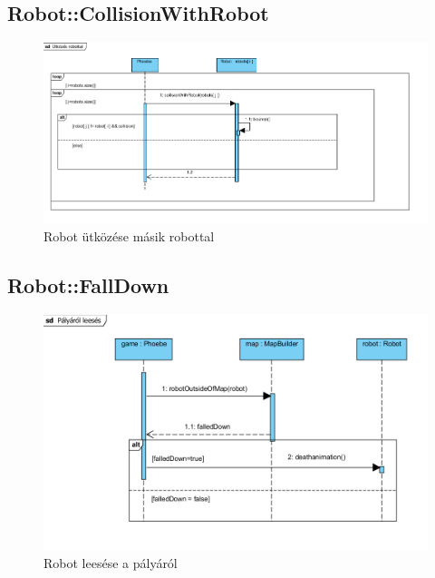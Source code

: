 \subsection{Robot::CollisionWithRobot}
\begin{figure}[h]
\begin{center}
\includegraphics[width=17cm]{images/collisionWithRobot()_sequence.PNG}
\caption{Robot ütközése másik robottal}
\label{fig:example5}
\end{center}
\end{figure}
\pagebreak

\subsection{Robot::FallDown}
\begin{figure}[h]
\begin{center}
\includegraphics[width=17cm]{images/FallingDown.PNG}
\caption{Robot leesése a pályáról}
\label{fig:example6}
\end{center}
\end{figure}
\pagebreak

